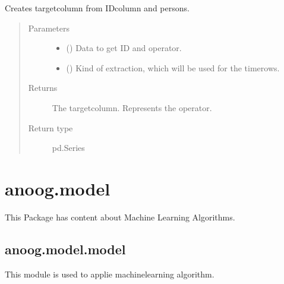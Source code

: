 \documentclass[letterpaper,10pt,english]{sphinxmanual}
\begin{document}

\begin{fulllineitems}
\label{\detokenize{anoog.io:anoog.io.data_io.y_labeling}}
\sphinxAtStartPar
Creates target\sphinxhyphen{}column from ID\sphinxhyphen{}column and persons.
\begin{quote}\begin{description}
\item[{Parameters}] \leavevmode\begin{itemize}
\item {} 
\sphinxAtStartPar
{} () \textendash{} Data to get ID and operator.

\item {} 
\sphinxAtStartPar
{} ({\hyperref[\detokenize{anoog.io:anoog.io.data_io.extraction_mode}]{}}) \textendash{} Kind of extraction, which will be used for the timerows.

\end{itemize}

\item[{Returns}] \leavevmode
\sphinxAtStartPar
The target\sphinxhyphen{}column. Represents the operator.

\item[{Return type}] \leavevmode
\sphinxAtStartPar
pd.Series

\end{description}\end{quote}

\end{fulllineitems}



\section{anoog.model}
\label{\detokenize{anoog.model:anoog-model}}\label{\detokenize{anoog.model::doc}}
\sphinxAtStartPar
This Package has content about Machine Learning Algorithms.


\subsection{anoog.model.model}
\label{\detokenize{anoog.model:module-anoog.model.model}}\label{\detokenize{anoog.model:anoog-model-model}}
\sphinxAtStartPar
This module is used to applie machine\sphinxhyphen{}learning algorithm.
\end{document}
